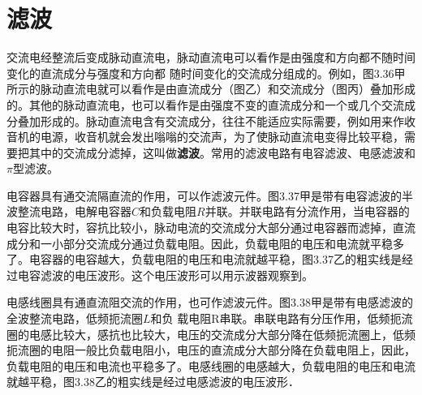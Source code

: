 \section{滤波}
交流电经整流后变成脉动直流电，脉动直流电可以看作是由强度和方向都不随时间变化的直流成分与强度和方向都
随时间变化的交流成分组成的。例如，图3.36甲所示的脉动直流电就可以看作是由直流成分（图乙）和交流成分（图丙）叠加形成的。其他的脉动直流电，也可以看作是由强度不变的直流成分和一个或几个交流成分叠加形成的。脉动直流电含有交流成分，往往不能适应实际需要，例如用来作收音机的电源，收音机就会发出嗡嗡的交流声，为了使脉动直流电变得比较平稳，需要把其中的交流成分滤掉，这叫做\textbf{滤波}。常用的滤波电路有电容滤波、电感滤波和$\pi$型滤波。
\begin{figure}[htp]\centering
        \caption{}
\end{figure}

电容器具有通交流隔直流的作用，可以作滤波元件。图3.37甲是带有电容滤波的半波整流电路，电解电容器$C$和负载电阻$R$并联。并联电路有分流作用，当电容器的电容比较大时，容抗比较小，脉动电流的交流成分大部分通过电容器而滤掉，直流成分和一小部分交流成分通过负载电阻。因此，负载电阻的电压和电流就平稳多了。电容器的电容越大，负载电阻的电压和电流就越平稳，图3.37乙的粗实线是经过电容滤波的电压波形。这个电压波形可以用示波器观察到。

电感线圈具有通直流阻交流的作用，也可作滤波元件。图3.38甲是带有电感滤波的全波整流电路，低频扼流圈$L$和负
载电阻R串联。串联电路有分压作用，低频扼流圈的电感比较大，感抗也比较大，电压的交流成分大部分降在低频扼流圈上，低频扼流圈的电阻一般比负载电阻小，电压的直流成分大部分降在负载电阻上，因此，负载电阻的电压和电流也平稳多了。电感线圈的电感越大，负载电阻的电压和电流就越平稳，图3.38乙的粗实线是经过电感滤波的电压波形．

